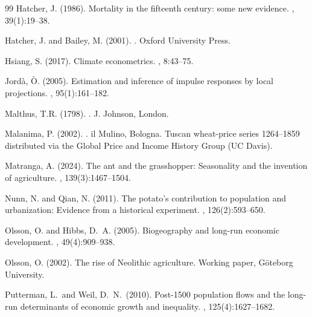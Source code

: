 \documentclass[11pt,letterpaper]{article}
\begin{document}
\begin{thebibliography}{99}
Hatcher, J. (1986).
\newblock Mortality in the fifteenth century: some new evidence.
, 39(1):19--38.

Hatcher, J. and Bailey, M. (2001).
.
\newblock Oxford University Press.


Hsiang, S. (2017).
\newblock Climate econometrics.
, 8:43--75.

Jord\`a, \`O. (2005).
\newblock Estimation and inference of impulse responses by local projections.
, 95(1):161--182.

Malthus, T.R. (1798).
.
\newblock J. Johnson, London.

Malanima, P. (2002).
.
\newblock il Mulino, Bologna.
\newblock Tuscan wheat-price series 1264--1859 distributed via the Global Price and Income History Group (UC Davis).

Matranga, A. (2024).
\newblock The ant and the grasshopper: Seasonality and the invention of agriculture.
, 139(3):1467--1504.

Nunn, N. and Qian, N. (2011).
\newblock The potato's contribution to population and urbanization: Evidence from a historical experiment.
, 126(2):593--650.

Olsson, O. and Hibbs, D.~A. (2005).
\newblock Biogeography and long-run economic development.
, 49(4):909--938.

Olsson, O. (2002).
\newblock The rise of Neolithic agriculture.
\newblock Working paper, Göteborg University.

Putterman, L.\ and Weil, D.~N.\ (2010).
\newblock Post-1500 population flows and the long-run determinants of economic growth and inequality.
, 125(4):1627--1682.


\end{thebibliography}
\end{document}
